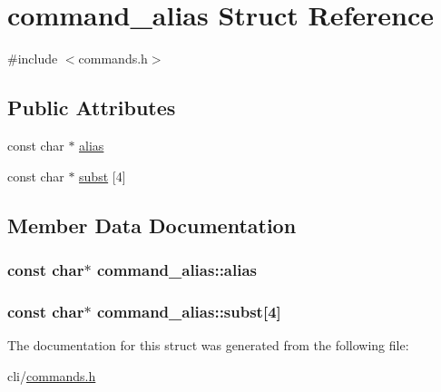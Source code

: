 \hypertarget{structcommand__alias}{\section{command\+\_\+alias Struct Reference}
\label{structcommand__alias}
}


{\ttfamily \#include $<$commands.\+h$>$}

\subsection*{Public Attributes}
\begin{DoxyCompactItemize}
\item 
const char $\ast$ \hyperlink{structcommand__alias_ae5e4cdccf0919a4083b1034ca7e7991f}{alias}
\item 
const char $\ast$ \hyperlink{structcommand__alias_a6ad3843d3a34e18c14b69cd4768bc948}{subst} \mbox{[}4\mbox{]}
\end{DoxyCompactItemize}


\subsection{Member Data Documentation}
\hypertarget{structcommand__alias_ae5e4cdccf0919a4083b1034ca7e7991f}{
\subsubsection[{alias}]{\setlength{\rightskip}{0pt plus 5cm}const char$\ast$ command\+\_\+alias\+::alias}}\label{structcommand__alias_ae5e4cdccf0919a4083b1034ca7e7991f}
\hypertarget{structcommand__alias_a6ad3843d3a34e18c14b69cd4768bc948}{
\subsubsection[{subst}]{\setlength{\rightskip}{0pt plus 5cm}const char$\ast$ command\+\_\+alias\+::subst\mbox{[}4\mbox{]}}}\label{structcommand__alias_a6ad3843d3a34e18c14b69cd4768bc948}


The documentation for this struct was generated from the following file\+:\begin{DoxyCompactItemize}
\item 
cli/\hyperlink{commands_8h}{commands.\+h}\end{DoxyCompactItemize}
